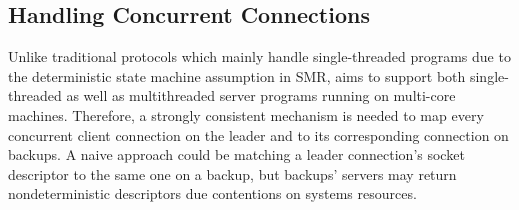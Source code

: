 



\subsection{Handling Concurrent Connections} \label{sec:concurrent}

Unlike traditional \paxos protocols which mainly handle single-threaded 
programs due to the deterministic state machine assumption in SMR, \xxx aims to 
support both single-threaded as well as multithreaded server programs running 
on multi-core machines. Therefore, a strongly consistent mechanism is needed to 
map every concurrent client connection on the leader and to its corresponding 
connection on backups. A naive approach could be matching a leader connection's 
socket descriptor to the same one on a backup, but backups' servers may return 
nondeterministic descriptors due contentions on systems resources.

